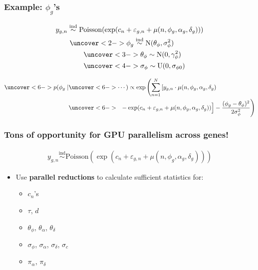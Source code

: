\documentclass[handout]{beamer}
\providecommand{\e}{\varepsilon}
\numberwithin{equation}{section}
\begin{document}


\begin{frame}
\frametitle{Example: $\phi_g$'s} \small
\begin{align*}
&y_{g,n} \stackrel{\text{ind}}{\sim} \text{Poisson}( \exp(c_n + \e_{g, n} + \mu(n, \phi_g, \alpha_g, \delta_g))) \\
& \qquad \uncover<2->{\phi_g \stackrel{\text{ind}}{\sim} \text{N}( \theta_\phi, \sigma_\phi^2)} \\
& \qquad \qquad \uncover<3->{\theta_\phi \stackrel{\text{}}{\sim} \text{N}( 0, \gamma_{\phi }^2)} \\
& \qquad \qquad \uncover<4->{\sigma_\phi \stackrel{\text{}}{\sim} \text{U}( 0, \sigma_{\phi 0})} \\
\end{align*}

\begin{itemize}
\end{itemize}

\begin{align*}
\uncover<6->{p(\phi_g \mid} & \uncover<6->{ \cdots) \propto \exp \left (\sum_{n = 1}^N \left [y_{g, n} \cdot \mu(n, \phi_g, \alpha_g, \delta_g) \right . \right .}  \\
&\uncover<6->{\left . \left . \frac{}{}- \exp (c_n + \e_{g, n} + \mu(n, \phi_g, \alpha_g, \delta_g)) \right ] - \frac{(\phi_g - \theta_\phi)^2}{2 \sigma_\phi^2} \right )}
\end{align*}
\end{frame}


\begin{frame}
\frametitle{Tons of opportunity for GPU parallelism across genes!}
\begin{align*}
y_{g,n} \stackrel{\text{ind}}{\sim} \text{Poisson}( \exp(c_n + \e_{g, n} + \mu(n, \phi_g, \alpha_g, \delta_g)))
\end{align*}

\begin{itemize}
\pause \item Use {\color{blue} \bf parallel reductions} to calculate sufficient statistics for:
\begin{itemize}
\pause \item $c_n$'s
\pause \item $\tau$, $d$
\pause \item $\theta_\phi$, $\theta_\alpha$, $\theta_\delta$
\pause \item $\sigma_\phi$, $\sigma_\alpha$, $\sigma_\delta$,  $\sigma_c$ 
\pause \item $\pi_\alpha$, $\pi_\delta$
\end{itemize}
\end{itemize}
\end{frame}
\end{document}
